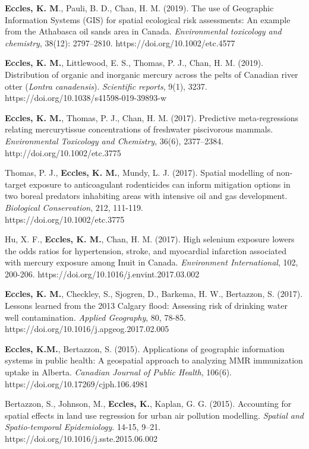 \documentclass[margin,line]{res}
\begin{document}
\begin{resume}
\textbf{Eccles, K. M}., Pauli, B. D., Chan, H. M. (2019). The use of Geographic Information Systems (GIS) for spatial ecological risk assessments: An example from the Athabasca oil sands area in Canada. \textit{Environmental toxicology and chemistry}, 38(12): 2797–2810. https://doi.org/10.1002/etc.4577

\textbf{Eccles, K. M.}, Littlewood, E. S., Thomas, P. J., Chan, H. M. (2019). Distribution of organic and inorganic mercury across the pelts of Canadian river otter (\textit{Lontra canadensis}). \textit{Scientific reports}, 9(1), 3237. https://doi.org/10.1038/s41598-019-39893-w

\textbf{Eccles, K. M.}, Thomas, P. J., Chan, H. M. (2017). Predictive meta-regressions relating mercurytissue concentrations of freshwater piscivorous mammals. \textit{Environmental Toxicology and Chemistry}, 36(6), 2377–2384. http://doi.org/10.1002/etc.3775

Thomas, P. J., \textbf{Eccles, K. M.}, Mundy, L. J. (2017). Spatial modelling of non-target exposure to anticoagulant rodenticides can inform mitigation options in two boreal predators inhabiting areas with intensive oil and gas development. \textit{Biological Conservation}, 212, 111-119. \\https://doi.org/10.1002/etc.3775

Hu, X. F., \textbf{Eccles, K. M.}, Chan, H. M. (2017). High selenium exposure lowers the odds ratios for hypertension, stroke, and myocardial infarction associated with mercury exposure among Inuit in Canada. \textit{Environment International}, 102, 200-206. https://doi.org/10.1016/j.envint.2017.03.002

\textbf{Eccles, K. M.}, Checkley, S., Sjogren, D., Barkema, H. W., Bertazzon, S. (2017). Lessons learned from the 2013 Calgary flood: Assessing risk of drinking water well contamination. \textit{Applied Geography}, 80, 78-85. https://doi.org/10.1016/j.apgeog.2017.02.005

\textbf{Eccles, K.M.}, Bertazzon, S. (2015). Applications of geographic information systems in public health: A geospatial approach to analyzing MMR immunization uptake in Alberta. \textit{Canadian Journal of Public Health}, 106(6). https://doi.org/10.17269/cjph.106.4981

Bertazzon, S., Johnson, M., \textbf{Eccles, K.}, Kaplan, G. G. (2015). Accounting for spatial effects in land use regression for urban air pollution modelling. \textit{Spatial and Spatio-temporal Epidemiology}. 14-15, 9–21. https://doi.org/10.1016/j.sste.2015.06.002


\end{resume}
\end{document}
